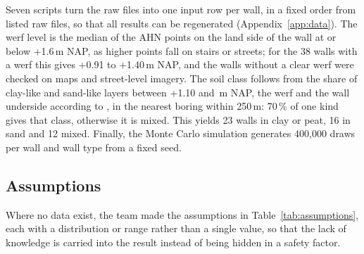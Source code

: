 Seven scripts turn the raw files into one input row per wall, in a fixed order
from listed raw files, so that all results can be regenerated
(Appendix~\ref{app:data}). The werf
level is the median of the AHN points on the land side of the wall at or
below +1.6\,m NAP, as higher points fall on stairs or streets; for the 38
walls with a werf this gives +0.91 to +1.40\,m NAP, and the walls without a
clear werf were checked on maps and street-level imagery. The soil class
follows from the share of clay-like and sand-like layers between +1.10 and
\,m NAP, the werf and the wall underside according to
\textcite{erfgoed158}, in the nearest boring within 250\,m: 70\,\% of one kind
gives that class, otherwise it is mixed. This yields 23 walls in clay or peat,
16 in sand and 12 mixed. Finally, the Monte Carlo simulation generates
400{,}000 draws per wall and wall type from a fixed seed.

\subsection{Assumptions}\label{sec:data-assumptions}

Where no data exist, the team made the assumptions in
Table~\ref{tab:assumptions}, each with a distribution or range rather than a
single value, so that the lack of knowledge is carried into the result instead
of being hidden in a safety factor.

